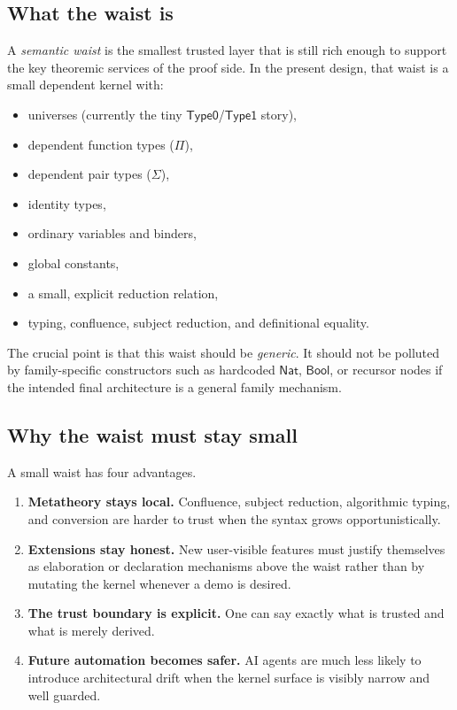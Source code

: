 \documentclass[11pt]{article}
\newcommand{\TypeZero}{\ensuremath{\mathsf{Type0}}}
\newcommand{\TypeOne}{\ensuremath{\mathsf{Type1}}}
\newcommand{\Nat}{\ensuremath{\mathsf{Nat}}}
\newcommand{\Bool}{\ensuremath{\mathsf{Bool}}}
\begin{document}
\subsection{What the waist is}

A \emph{semantic waist} is the smallest trusted layer that is still rich enough
to support the key theoremic services of the proof side. In the present design,
that waist is a small dependent kernel with:
\begin{itemize}[leftmargin=2em]
  \item universes (currently the tiny \TypeZero{}/\TypeOne{} story),
  \item dependent function types ($\Pi$),
  \item dependent pair types ($\Sigma$),
  \item identity types,
  \item ordinary variables and binders,
  \item global constants,
  \item a small, explicit reduction relation,
  \item typing, confluence, subject reduction, and definitional equality.
\end{itemize}

The crucial point is that this waist should be \emph{generic}. It should not be
polluted by family-specific constructors such as hardcoded \Nat{}, \Bool{}, or
recursor nodes if the intended final architecture is a general family mechanism.

\subsection{Why the waist must stay small}

A small waist has four advantages.
\begin{enumerate}[leftmargin=2em]
  \item \textbf{Metatheory stays local.} Confluence, subject reduction,
  algorithmic typing, and conversion are harder to trust when the syntax grows
  opportunistically.
  \item \textbf{Extensions stay honest.} New user-visible features must justify
  themselves as elaboration or declaration mechanisms above the waist rather
  than by mutating the kernel whenever a demo is desired.
  \item \textbf{The trust boundary is explicit.} One can say exactly what is
  trusted and what is merely derived.
  \item \textbf{Future automation becomes safer.} AI agents are much less
  likely to introduce architectural drift when the kernel surface is visibly
  narrow and well guarded.
\end{enumerate}
\end{document}
